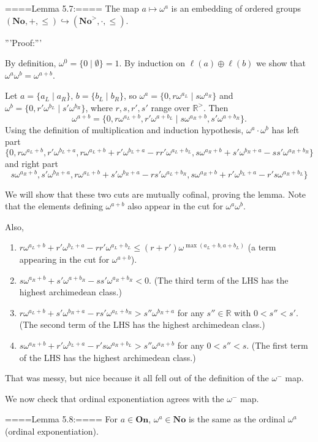 ====Lemma 5.7:==== 
The map $a\mapsto \omega^a$ is an embedding of ordered groups $(\mathbf{No},+,\le)\hookrightarrow (\mathbf{No}^>,\cdot,\le)$.

'''Proof:''' 

By definition, $\omega^0=\{0\mid \emptyset\}=1$. By induction on $\ell(a)\oplus \ell(b)$ we show that $\omega^a\omega^b=\omega^{a+b}$.

Let $a=\{a_L\mid a_R\}$, $b=\{b_L\mid b_R\}$, so $\omega^a=\{0,r\omega^{a_L}\mid s\omega^{a_R}\}$ and $\omega^b=\{0,r'\omega^{b_L}\mid s'\omega^{b_R}\}$, where $r,s,r',s'$ range over $\mathbb{R}^>$. Then 
$$\omega^{a+b}=\{0,r\omega^{a_L+b},r'\omega^{a+b_L}\mid s\omega^{a_R+b}, s'\omega^{a+b_R}\}.$$
Using the definition of multiplication and induction hypothesis,
$\omega^a\cdot\omega^b$ has left part
$$\{0,r\omega^{a_L+b}, r'\omega^{b_L+a},r\omega^{a_L+b}+r'\omega^{b_L+a}-rr'\omega^{a_L+b_L},s\omega^{a_R+b}+s'\omega^{b_R+a}-ss'\omega^{a_R+b_R}\}$$
and right part
$$s\omega^{a_R+b},s'\omega^{b_R+a},r\omega^{a_L+b}+s'\omega^{b_R+a}-rs'\omega^{a_L+b_R},s\omega^{a_R+b}+r'\omega^{b_L+a}-r's\omega^{a_R+b_L}\}$$

We will show that these two cuts are mutually cofinal, proving the lemma. Note that the elements defining $\omega^{a+b}$ also appear in the cut for $\omega^a\omega^b$.

Also, 
\begin{enumerate}
  \item  $r\omega^{a_L+b}+r'\omega^{b_L+a}-rr'\omega^{a_L+b_L}\le (r+r')\omega^{\max(a_L+b,a+b_L)}$ (a term appearing in the cut for $\omega^{a+b}$).
  \item  $s\omega^{a_R+b}+s'\omega^{a+b_R}-ss'\omega^{a_R+b_R}<0$. (The third term  of the LHS has the highest archimedean class.)
  \item  $r\omega^{a_L+b}+s'\omega^{b_R+a}-rs'\omega^{a_L+b_R}>s''\omega^{b_R+a}$ for any $s''\in\mathbb{R}$ with $0<s''<s'$. (The second term of the LHS has the highest archimedean class.)
  \item  $s\omega^{a_R+b}+r'\omega^{b_L+a}-r's\omega^{a_R+b_L}>s''\omega^{a_R+b}$ for any $0<s''<s$. (The first term of the LHS has the highest archimedean class.)
\end{enumerate}

That was messy, but nice because it all fell out of the definition of the $\omega^-$ map.

We now check that ordinal exponentiation agrees with the $\omega^-$ map.

====Lemma 5.8:====
For $a\in\mathbf{On}$, $\omega^a\in\mathbf{No}$ is the same as the ordinal $\omega^a$ (ordinal exponentiation).

